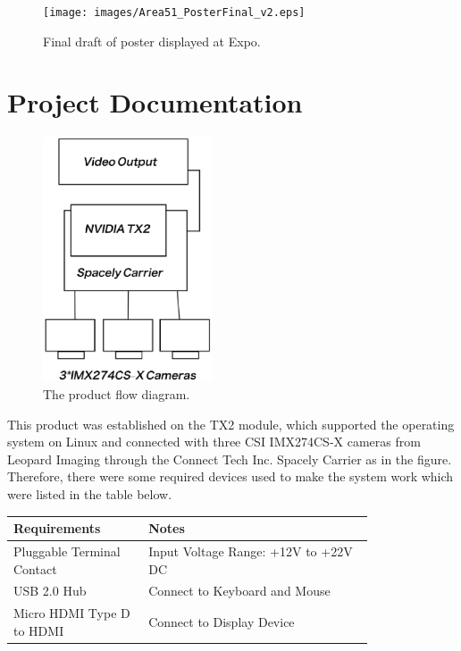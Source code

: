 \documentclass[letterpaper,10pt,serif,draftclsnofoot,onecolumn,compsoc,titlepage]{IEEEtran}
\begin{document}
	\begin{figure}[H]
		\centering
		\label{fig:ExpoPosterFinal_v2}
		\texttt{[image: images/Area51\_PosterFinal\_v2.eps]}
		\caption{Final draft of poster displayed at Expo. \label{overflow}}
	\end{figure}

\newpage

\section{Project Documentation}
\begin{figure}[H]
  \centering
  \label{fig: The product flow diagram.}
  \includegraphics[width=5cm]{images/diagram2.eps}
  \caption{The product flow diagram. \label{overflow}}
\end{figure}

This product was established on the TX2 module, which supported the operating system on Linux and 
connected with three CSI IMX274CS-X cameras from Leopard Imaging through the Connect Tech Inc. 
Spacely Carrier as in the figure. Therefore, there were some required devices used to make the 
system work which were listed in the table below. \\

\begin{tabular}{|p{0.3\linewidth}|p{0.5\linewidth}|}
   \hline
   \textbf{Requirements} & \textbf{Notes} \\ 
   \hline
	Pluggable Terminal Contact & Input Voltage Range: +12V to +22V DC \\
   \hline
   USB 2.0 Hub & Connect to Keyboard and Mouse \\
   \hline
   Micro HDMI Type D to HDMI & Connect to Display Device \\
   \hline
\end{tabular}
\end{document}
